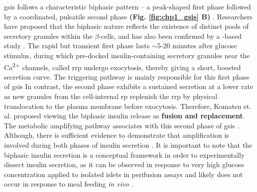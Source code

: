\par \gls{gsis} follows a characteristic biphasic pattern – a peak-shaped first phase followed by a coordinated, pulsatile second phase \textbf{(Fig. \ref{fig:chp1_gsis} B)} \textbf{\cite{ashcroft_diabetes_2012,grodsky_threshold_1972,komatsu_glucosestimulated_2013}}. Researchers have proposed that the biphasic nature reflects the existence of distinct pools of secretory granules within the $\beta$-cells, and has also been confirmed by a -based study \textbf{\cite{ashcroft_diabetes_2012,takahashi_snare_2010}}. The rapid but transient first phase lasts $\sim$5-20 minutes after glucose stimulus, during which pre-docked insulin-containing secretory granules near the Ca\textsuperscript{2+} channels, called \gls{rrp} undergo exocytosis, thereby giving a short, boosted secretion curve. The triggering pathway is mainly responsible for this first phase of \gls{gsis} \textbf{\cite{kalwat_mechanisms_2017,campbell_mechanisms_2021}} %
In contrast, the second phase exhibits a sustained secretion at a lower rate as new granules from the cell-internal \gls{rp} replenish the \gls{rrp} by physical translocation to the plasma membrane before exocytosis. Therefore, Komatsu et. al. \textbf{\cite{komatsu_glucosestimulated_2013}} proposed viewing the biphasic insulin release as \textbf{fusion and replacement}. The metabolic amplifying pathway associates with this second phase of \gls{gsis} \textbf{\cite{kalwat_mechanisms_2017,campbell_mechanisms_2021}}. Although, there is sufficient evidence to demonstrate that amplification is involved during both phases of insulin secretion \textbf{\cite{mourad_metabolic_2010,mourad_metabolic_2011}}. It is important to note that the biphasic insulin secretion is a conceptual framework in order to experimentally dissect insulin secretion, as it can be observed in response to very high glucose concentration applied to isolated islets in perifusion assays and likely does not occur in response to meal feeding \textit{in vivo} \textbf{\cite{aizawa_rab27a_2005}}.\\


